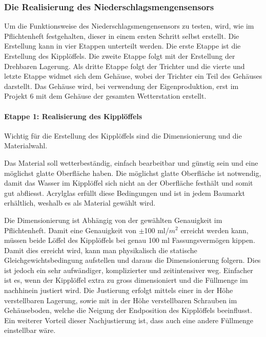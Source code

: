 \subsubsection*{\textbf{Die Realisierung des Niederschlagsmengensensors}}
Um die Funktionsweise des Niederschlagsmengensensors  zu testen, wird, wie im Pflichtenheft festgehalten, dieser in einem ersten Schritt selbst erstellt. Die Erstellung kann in vier Etappen unterteilt werden. Die erste Etappe ist die Erstellung des Kipplöffels. Die zweite Etappe folgt mit der Erstellung der Drehbaren Lagerung. Als dritte Etappe folgt der Trichter und die vierte und letzte Etappe widmet sich dem Gehäuse, wobei der Trichter ein Teil des Gehäuses darstellt. Das Gehäuse wird, bei verwendung der Eigenproduktion, erst im Projekt 6 mit dem Gehäuse der gesamten Wetterstation erstellt.
\paragraph{\textbf{Etappe 1: Realisierung des Kipplöffels}}
Wichtig für die Erstellung des Kipplöffels sind die Dimensionierung und die Materialwahl.
 
Das Material soll wetterbeständig, einfach bearbeitbar und günstig sein und eine möglichst glatte Oberfläche haben. Die möglichst glatte Oberfläche ist notwendig, damit das Wasser im Kipplöffel sich nicht an der Oberfläche festhält und somit gut abfliesst. Acrylglas erfüllt diese Bedingungen und ist in jedem Baumarkt erhältlich, weshalb es als Material gewählt wird.

Die Dimensionierung ist Abhängig von der gewählten Genauigkeit im Pflichtenheft. Damit eine Genauigkeit von $\pm$100 ml/$m^2$ erreicht werden kann, müssen beide Löffel des Kipplöffels bei genau 100 ml Fassungsvermögen kippen. Damit dies erreicht wird, kann man physikalisch die statische Gleichgewichtsbedingung aufstellen und daraus die Dimensionierung folgern. Dies ist jedoch ein sehr aufwändiger, komplizierter und zeitintensiver weg. Einfacher ist es, wenn der Kipplöffel extra zu gross dimensioniert und die Füllmenge im nachhinein justiert wird. Die Justierung erfolgt mittels einer in der Höhe verstellbaren Lagerung, sowie mit in der Höhe verstellbaren Schrauben im Gehäuseboden, welche die Neigung der Endposition des Kipplöffels beeinflusst. Ein weiterer Vorteil dieser Nachjustierung ist, dass auch eine andere Füllmenge einstellbar wäre.

